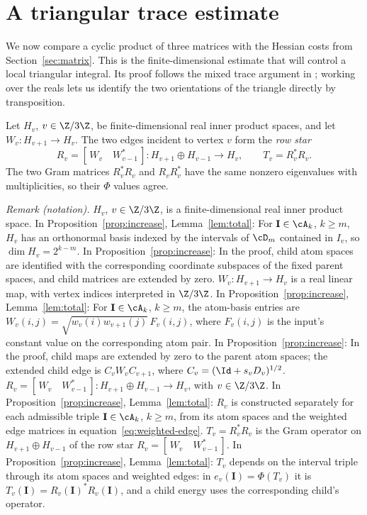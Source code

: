 \section{A triangular trace estimate}\label{sec:trace}

We now compare a cyclic product of three matrices with the Hessian
costs from Section~\ref{sec:matrix}. This is the finite-dimensional
estimate that will control a local triangular integral. Its proof
follows the mixed trace argument in \cite[Section~3]{OpenAI2026};
working over the reals lets us identify the two orientations of the
triangle directly by transposition.

Let \(H_v\), \(v\in\Z/3\Z\), be finite-dimensional real inner product
spaces, and let \(W_v:H_{v+1}\to H_v\). The two edges incident to
vertex \(v\) form the \emph{row star}
\begin{equation}\label{eq:row-star}
 R_v=[\,W_v\quad W_{v-1}^*\,]:
              H_{v+1}\oplus H_{v-1}\longrightarrow H_v,
 \qquad T_v=R_v^*R_v.
\end{equation}
The two Gram matrices \(R_v^*R_v\) and \(R_vR_v^*\) have the same
nonzero eigenvalues with multiplicities, so their \(\Phi\) values
agree.

\noindent\textit{Remark (notation).} $H_v$, $v\in\Z/3\Z$, is a finite-dimensional real inner product space. In Proposition~\ref{prop:increase}, Lemma~\ref{lem:total}: For $\mathbf I\in\cA_k$, $k\ge m$, $H_v$ has an orthonormal basis indexed by the intervals of $\cD_m$ contained in $I_v$, so $\dim H_v=2^{k-m}$. In Proposition~\ref{prop:increase}: In the proof, child atom spaces are identified with the corresponding coordinate subspaces of the fixed parent spaces, and child matrices are extended by zero. $W_v:H_{v+1}\to H_v$ is a real linear map, with vertex indices interpreted in $\Z/3\Z$. In Proposition~\ref{prop:increase}, Lemma~\ref{lem:total}: For $\mathbf I\in\cA_k$, $k\ge m$, the atom-basis entries are $W_v(i,j)=\sqrt{w_v(i)w_{v+1}(j)}\,F_v(i,j)$, where $F_v(i,j)$ is the input's constant value on the corresponding atom pair. In Proposition~\ref{prop:increase}: In the proof, child maps are extended by zero to the parent atom spaces; the extended child edge is $C_vW_vC_{v+1}$, where $C_v=(\Id+s_vD_v)^{1/2}$. $R_v=[\,W_v\quad W_{v-1}^*\,]:H_{v+1}\oplus H_{v-1}\to H_v$, with $v\in\Z/3\Z$. In Proposition~\ref{prop:increase}, Lemma~\ref{lem:total}: $R_v$ is constructed separately for each admissible triple $\mathbf I\in\cA_k$, $k\ge m$, from its atom spaces and the weighted edge matrices in equation~\ref{eq:weighted-edge}. $T_v=R_v^*R_v$ is the Gram operator on $H_{v+1}\oplus H_{v-1}$ of the row star $R_v=[\,W_v\quad W_{v-1}^*\,]$. In Proposition~\ref{prop:increase}, Lemma~\ref{lem:total}: $T_v$ depends on the interval triple through its atom spaces and weighted edges: in $e_v(\mathbf I)=\Phi(T_v)$ it is $T_v(\mathbf I)=R_v(\mathbf I)^*R_v(\mathbf I)$, and a child energy uses the corresponding child's operator.


